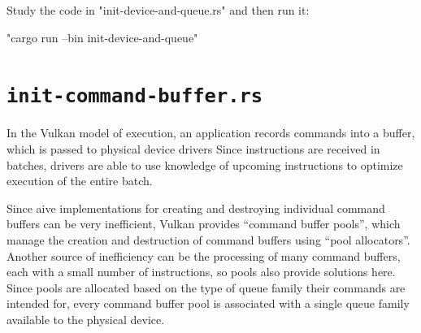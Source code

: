 \documentclass[12pt,letterpaper]{article}
\newcommand{\inquotes}[1]{``#1''}	%
\begin{document}
	Study the code in "init-device-and-queue.rs" and then run it:
    	\begin{center}
    		"cargo run --bin init-device-and-queue"
    	\end{center}
      
\section{\texttt{init-command-buffer.rs}}
	In the Vulkan model of execution, an application records commands into a buffer, which is passed to physical device drivers Since instructions are received in batches, drivers are able to use knowledge of upcoming instructions to optimize execution of the entire batch. 
    
	Since aive implementations for creating and destroying individual command buffers can be very inefficient, Vulkan provides \inquotes{command buffer pools}, which manage the creation and destruction of command buffers using \inquotes{pool allocators}. Another source of inefficiency can be the processing of many command buffers, each with a small number of instructions, so pools also provide solutions here. Since pools are allocated based on the type of queue family their commands are intended for, every command buffer pool is associated with a single queue family available to the physical device.
	
\end{document}

